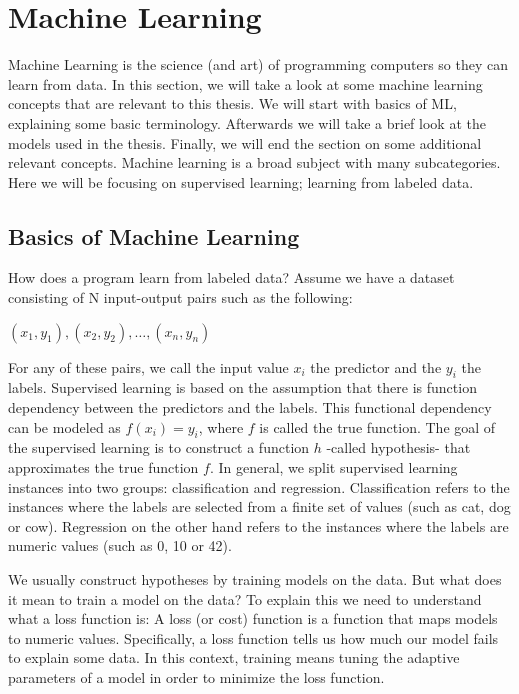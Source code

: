 \section{Machine Learning}
Machine Learning is the science (and art) of programming computers so they can learn from data. \parencite{ml:homl}
In this section, we will take a look at some machine learning concepts that are relevant to this thesis.
We will start with basics of ML, explaining some basic terminology. 
Afterwards we will take a brief look at the models used in the thesis.
Finally, we will end the section on some additional relevant concepts.
Machine learning is a broad subject with many subcategories.
Here we will be focusing on supervised learning; learning from labeled data.

\subsection{Basics of Machine Learning}
How does a program learn from labeled data?
Assume we have a dataset consisting of N input-output pairs such as the following:
 
$(x_1,y_1), (x_2,y_2), \ldots, (x_n,y_n)$

For any of these pairs, we call the input value $x_i$ the predictor and the $y_i$ the labels.\parencite{ml:homl}
Supervised learning is based on the assumption that there is function dependency between the predictors and the labels.
This functional dependency can be modeled as $f(x_i)=y_i$, where $f$ is called the true function.
The goal of the supervised learning is to construct a function $h$ -called hypothesis- that approximates the true function $f$.
In general, we split supervised learning instances into two groups: classification and regression. 
Classification refers to the instances where the labels are selected from a finite set of values (such as cat, dog or cow).
Regression on the other hand refers to the instances where the labels are numeric values (such as 0, 10 or 42). \parencite{ai:ml}

We usually construct hypotheses by training models on the data.
But what does it mean to train a model on the data?
To explain this we need to understand what a loss function is:
A loss (or cost) function is a function that maps models to numeric values.
Specifically, a loss function tells us how much our model fails to explain some data.
In this context, training means tuning the adaptive parameters of a model in order to minimize the loss function. \parencite{ml:prml}

